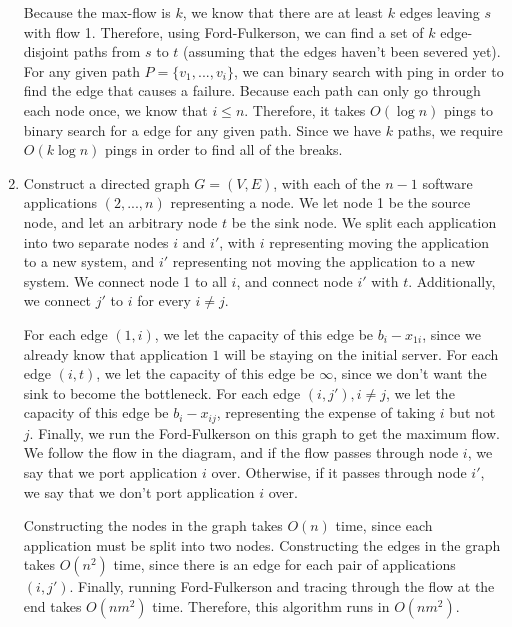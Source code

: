 \documentclass[oneside, 12pt]{article}
\begin{document}
\begin{enumerate}
Because the max-flow is $k$, we know that there are at least $k$ edges leaving $s$ with flow 1. Therefore, using Ford-Fulkerson, we can find a set of $k$ edge-disjoint paths from $s$ to $t$ (assuming that the edges haven't been severed yet). For any given path $P = \{v_1, ..., v_i\}$, we can binary search with ping in order to find the edge that causes a failure. Because each path can only go through each node once, we know that $i \le n$. Therefore, it takes $O(\log n)$ pings to binary search for a edge for any given path. Since we have $k$ paths, we require $O(k\log n)$ pings in order to find all of the breaks.
\clearpage
\setcounter{enumi}{28}
\item
Construct a directed graph $G = (V, E)$, with each of the $n-1$ software applications $(2, ...,n)$ representing a node. We let node 1 be the source node, and let an arbitrary node $t$ be the sink node. We split each application into two separate nodes $i$ and $i'$, with $i$ representing moving the application to a new system, and $i'$ representing not moving the application to a new system. We connect node 1 to all $i$, and connect node $i'$ with $t$. Additionally, we connect $j'$ to $i$ for every $ i \ne j$. 

For each edge $(1, i)$, we let the capacity of this edge be $b_i - x_{1i}$, since we already know that application $1$ will be staying on the initial server. For each edge $(i, t)$, we let the capacity of this edge be $\infty$, since we don't want the sink to become the bottleneck. For each edge $(i, j'), i\ne j$, we let the capacity of this edge be $b_i - x_{ij}$, representing the expense of taking $i$ but not $j$. Finally, we run the Ford-Fulkerson on this graph to get the maximum flow. We follow the flow in the diagram, and if the flow passes through node $i$, we say that we port application $i$ over. Otherwise, if it passes through node $i'$, we say that we don't port application $i$ over.

Constructing the nodes in the graph takes $O(n)$ time, since each application must be split into two nodes. Constructing the edges in the graph takes $O(n^2)$ time, since there is an edge for each pair of applications $(i, j')$. Finally, running Ford-Fulkerson and tracing through the flow at the end takes $O(nm^2)$ time. Therefore, this algorithm runs in $O(nm^2)$. 
\end{enumerate}
\end{document}
